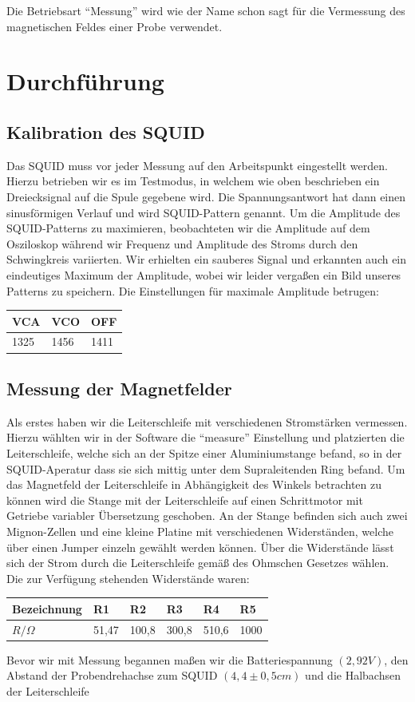 \documentclass[12pt]{article}
\begin{document}
Die Betriebsart "`Messung"' wird wie der Name schon sagt für die Vermessung des magnetischen Feldes einer Probe verwendet.

\section{Durchführung}
\subsection{Kalibration des SQUID}
Das SQUID muss vor jeder Messung auf den Arbeitspunkt eingestellt werden. Hierzu betrieben wir es im Testmodus, in welchem wie oben beschrieben ein Dreiecksignal auf die Spule gegebene wird. Die Spannungsantwort hat dann einen sinusförmigen Verlauf und wird SQUID-Pattern genannt. Um die Amplitude des SQUID-Patterns zu maximieren, beobachteten wir die Amplitude auf dem Osziloskop während wir Frequenz und Amplitude des Stroms durch den Schwingkreis variierten. Wir erhielten ein sauberes Signal und erkannten auch ein eindeutiges Maximum der Amplitude, wobei wir leider vergaßen ein Bild unseres Patterns zu speichern. Die Einstellungen für maximale Amplitude betrugen:
\begin{center}
\begin{tabular}{|l|l|l|}
\hline
VCA & VCO & OFF \\ 
\hline
1325 & 1456 & 1411 \\ 
\hline
\end{tabular}
\end{center}

\subsection{Messung der Magnetfelder}
Als erstes haben wir die Leiterschleife mit verschiedenen Stromstärken vermessen.
Hierzu wählten wir in der Software die "`measure"' Einstellung und platzierten die Leiterschleife, welche sich an der Spitze einer Aluminiumstange befand, so in der SQUID-Aperatur dass sie sich mittig unter dem Supraleitenden Ring befand. Um das Magnetfeld der Leiterschleife in Abhängigkeit des Winkels betrachten zu können wird die Stange mit der Leiterschleife auf einen Schrittmotor mit Getriebe variabler Übersetzung geschoben. An der Stange befinden sich auch zwei Mignon-Zellen und eine kleine Platine mit verschiedenen Widerständen, welche über einen Jumper einzeln gewählt werden können. Über die Widerstände lässt sich der Strom durch die Leiterschleife gemäß des Ohmschen Gesetzes wählen. Die zur Verfügung stehenden Widerstände waren:
\begin{center}
\begin{tabular}{|l|lllll|}
\hline 
Bezeichnung & R1 & R2 & R3 & R4 & R5\\
\hline 
$R / \Omega$ & 51,47 & 100,8 & 300,8 & 510,6 & 1000\\
\hline 
\end{tabular}
\end{center}
Bevor wir mit Messung begannen maßen wir die Batteriespannung $(2,92V)$, den Abstand der Probendrehachse
 zum SQUID $(4,4 \pm 0,5 cm)$ und die Halbachsen der Leiterschleife
\end{document}
